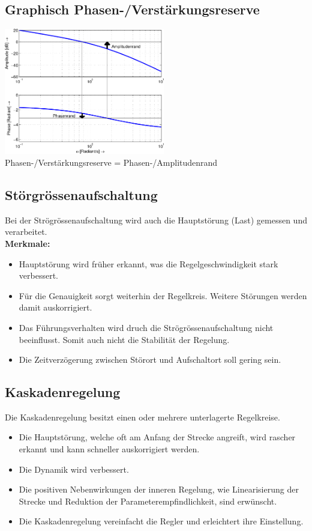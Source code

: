 \begin{multicols}{2}
  \subsection{Graphisch Phasen-/Verstärkungsreserve}
    \includegraphics[width=7cm]{./images/bode-stabilitaet.png} \\
    Phasen-/Verstärkungsreserve = Phasen-/Amplitudenrand
    
\columnbreak

  \subsection{Störgrössenaufschaltung }
    Bei der Strögrössenaufschaltung wird auch die Hauptstörung (Last) gemessen und verarbeitet.\\
    \textbf{Merkmale:}
    \begin{itemize}[leftmargin=*]
      \item Hauptstörung wird früher erkannt, was die Regelgeschwindigkeit stark verbessert.
      \item Für die Genauigkeit sorgt weiterhin der Regelkreis. Weitere Störungen werden damit auskorrigiert.
      \item Das Führungsverhalten wird druch die Strögrössenaufschaltung nicht beeinflusst. Somit auch nicht
            die Stabilität der Regelung.
      \item Die Zeitverzögerung zwischen Störort und Aufschaltort soll gering sein.
    \end{itemize}
\end{multicols}

\subsection{Kaskadenregelung }
  Die Kaskadenregelung besitzt einen oder mehrere unterlagerte Regelkreise.\\
  \begin{itemize}
    \item Die Hauptstörung, welche oft am Anfang der Strecke angreift, wird rascher erkannt und kann
          schneller auskorrigiert werden.
    \item Die Dynamik wird verbessert.
    \item Die positiven Nebenwirkungen der inneren Regelung, wie Linearisierung der Strecke
          und Reduktion der Parameterempfindlichkeit, sind erwünscht.
    \item Die Kaskadenregelung vereinfacht die Regler und erleichtert ihre Einstellung.
  \end{itemize}

